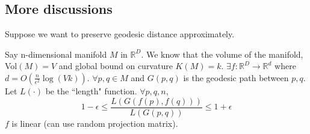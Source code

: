 \subsection*{More discussions}
Suppose we want to preserve geodesic distance approximately.
\begin{theorem}[JL-manifold]
Say n-dimensional manifold $M$ in $\mathbb{R}^D$. We know that the
volume of the manifold, Vol$(M)=V$ and global bound on curvature
$K(M)=k$. $\exists f: \mathbb{R}^D \rightarrow \mathbb{R}^d$ where
$d=O(\frac{n}{\epsilon^2}\log (Vk) )$. $\forall p,q \in M$ and
$G(p,q)$ is the geodesic path between $p,q$. Let $L(\cdot)$ be the
``length" function. $\forall p,q,n$, 
\[
1-\epsilon \leq \frac{L(G(f(p),f(q)))}{L(G(p,q))} \leq 1+\epsilon
\]
$f$ is linear (can use random projection matrix).
\end{theorem}
